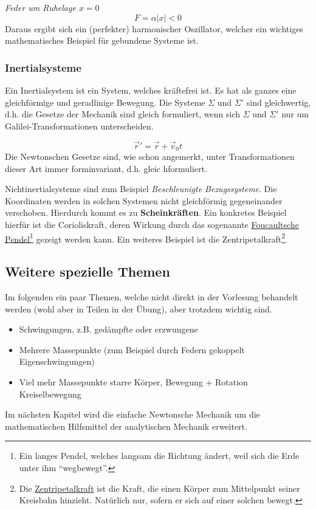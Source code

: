 \begin{beispiel*}
\textit{Feder um Ruhelage $x = 0$}
$$F = \alpha |x| < 0$$
Daraus ergibt sich ein (perfekter) harmonischer Oszillator, welcher ein wichtiges mathematisches Beispiel für gebundene Systeme ist.
\end{beispiel*}


\subsubsection{Inertialsysteme}
\begin{definition*}[Inertialsystem]
	Ein Inertialsystem ist ein System, welches kräftefrei ist. Es hat als ganzes eine gleichförmige und geradlinige Bewegung.
Die Systeme $\Sigma$ und $\Sigma'$ sind gleichwertig, d.h. die Gesetze der Mechanik sind gleich formuliert, wenn sich $\Sigma$ und $\Sigma'$ nur um Galilei-Transformationen unterscheiden.
\end{definition*}

\begin{definition*}
$$ \vec{r}' = \vec{r} + \vec{v}_0t$$
Die Newtonschen Gesetze sind, wie schon angemerkt, unter Transformationen dieser Art immer forminvariant, d.h. gleic hformuliert.
\end{definition*}

\begin{definition*}[Nichtinertialsysteme]
	Nichtinertialsysteme sind zum Beispiel \textit{Beschleunigte Bezugssysteme}. Die Koordinaten werden in solchen Systemen nicht gleichförmig gegeneinander verschoben. Hierdurch kommt es zu \textbf{Scheinkräften}. Ein konkretes Beispiel hierfür ist die Corioliskraft, deren Wirkung durch das sogenannte \href{https://de.wikipedia.org/wiki/Foucaultsches_Pendel}{Foucaultsche Pendel}\footnote{Ein langes Pendel, welches langsam die Richtung ändert, weil sich die Erde unter ihm "`wegbewegt"'.} gezeigt werden kann. Ein weiteres Beispiel ist die Zentripetalkraft\footnote{Die \href{http://de.wikipedia.org/wiki/Zentripetalkraft}{Zentripetalkraft} ist die Kraft, die einen Körper zum Mittelpunkt seiner Kreisbahn hinzieht. Natürlich nur, sofern er sich auf einer solchen bewegt.}.
\end{definition*}


\subsection{Weitere spezielle Themen}
Im folgenden ein paar Themen, welche nicht direkt in der Vorlesung behandelt werden (wohl aber in Teilen in der Übung), aber trotzdem wichtig sind.
\begin{itemize}
	\item Schwingungen, z.B. gedämpfte oder erzwungene
	\item Mehrere Massepunkte (zum Beispiel durch Federn gekoppelt \conseq Eigenschwingungen) 
	\item Viel mehr Massepunkte \conseq starre Körper, Bewegung $+$ Rotation \conseq Kreiselbewegung
\end{itemize}
Im nächsten Kapitel wird die einfache Newtonsche Mechanik um die mathematischen Hilfsmittel der analytischen Mechanik erweitert.

